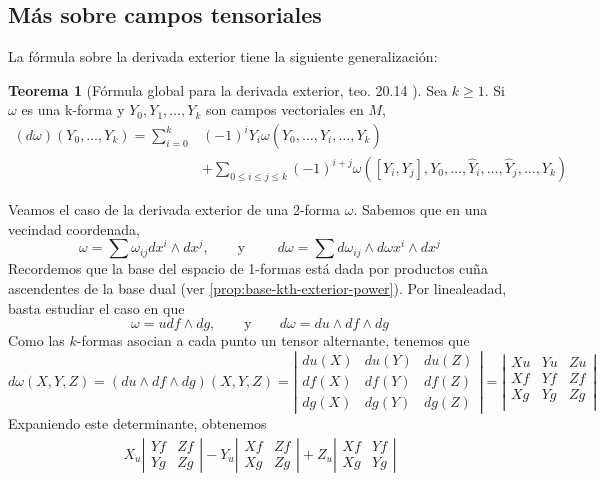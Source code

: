 \documentclass[spanish]{book}
\theoremstyle{definition}
\newtheorem*{teo}{Teorema}
\begin{document}
	\subsection{Más sobre campos tensoriales}
	La fórmula sobre la derivada exterior tiene la siguiente generalización:
	\begin{teo}[Fórmula global para la derivada exterior, teo. 20.14 \cite{Loring}]
		Sea $k\geq1$. Si $\omega$ es una k-forma y $Y_0,Y_1,\ldots,Y_k$ son campos vectoriales en $M$,
		\begin{align*}
			(d\omega)(Y_0,\ldots,Y_k)=\sum_{i=0}^k&(-1)^iY_i\omega(Y_0,\ldots,\hat{Y}_i,\ldots, Y_k)\\
			&+\sum_{0\leq i\leq j\leq k}(-1)^{i+j}\omega([Y_i,Y_j],Y_0,\ldots,\hat{Y}_i,\ldots,\hat{Y}_j,\ldots,Y_k)
		\end{align*}
	\end{teo}
	Veamos el caso de la derivada exterior de una 2-forma $\omega$. Sabemos que en una vecindad coordenada,
	\[\omega=\sum\omega_{ij}dx^i\wedge dx^j,\qquad\text{y }\qquad d\omega=\sum d\omega_{ij}\wedge d\omega x^i\wedge dx^j\]
	Recordemos que la base del espacio de 1-formas está dada por productos cuña ascendentes de la base dual (ver \cref{prop:base-kth-exterior-power}). Por linealeadad, basta estudiar el caso en que
	\[\omega=udf\wedge dg,\qquad\text{y}\qquad d\omega=d u\wedge df\wedge dg\]
	Como las $k$-formas asocian a cada punto un tensor alternante, tenemos que
	\[d\omega(X,Y,Z)=(d u\wedge df\wedge dg)(X,Y,Z)=\left|\begin{matrix}
		du(X)&du(Y)&du(Z)\\
		df(X)&df(Y)&df(Z)\\
		dg(X)&dg(Y)&dg(Z)
	\end{matrix}\right|
	=\left|\begin{matrix}
		Xu&Yu&Zu\\
		Xf&Yf&Zf\\
		Xg&Yg&Zg\\
	\end{matrix}\right|\]
	Expaniendo este determinante, obtenemos
	\begin{align*}
		X_u\left|\begin{matrix}
			Yf&Zf\\
			Yg&Zg
		\end{matrix}\right|
		-Y_u\left|\begin{matrix}
			Xf&Zf\\
			Xg&Zg
		\end{matrix}\right|
		+Z_u\left|\begin{matrix}
			Xf&Yf\\
			Xg&Yg
		\end{matrix}\right|
	\end{align*}
\end{document}
